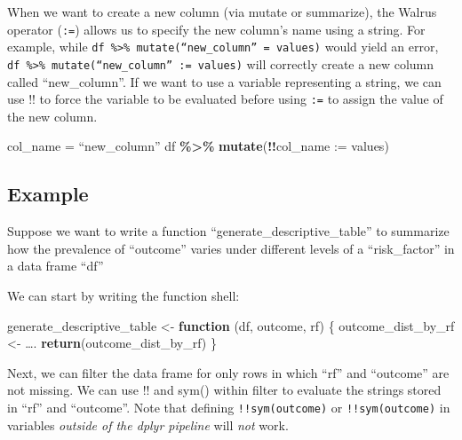 \documentclass[
]{book}
\newenvironment{Shaded}{\begin{snugshade}}{\end{snugshade}}
\newcommand{\AttributeTok}[1]{\textcolor[rgb]{0.13,0.29,0.53}{#1}}
\newcommand{\ControlFlowTok}[1]{\textcolor[rgb]{0.13,0.29,0.53}{\textbf{#1}}}
\newcommand{\FunctionTok}[1]{\textcolor[rgb]{0.13,0.29,0.53}{\textbf{#1}}}
\newcommand{\NormalTok}[1]{#1}
\newcommand{\OtherTok}[1]{\textcolor[rgb]{0.56,0.35,0.01}{#1}}
\newcommand{\SpecialCharTok}[1]{\textcolor[rgb]{0.81,0.36,0.00}{\textbf{#1}}}
\begin{document}
When we want to create a new column (via mutate or summarize), the Walrus operator (\texttt{:=}) allows us to specify the new column's name using a string. For example, while \texttt{df\ \%\textgreater{}\%\ mutate(“new\_column”\ =\ values)} would yield an error, \texttt{df\ \%\textgreater{}\%\ mutate(“new\_column”\ :=\ values)} will correctly create a new column called ``new\_column''.
If we want to use a variable representing a string, we can use !! to force the variable to be evaluated before using \texttt{:=} to assign the value of the new column.

\begin{Shaded}
\begin{Highlighting}[]
\NormalTok{col\_name }\OtherTok{=}\NormalTok{ “new\_column”}
\NormalTok{df }\SpecialCharTok{\%\textgreater{}\%} \FunctionTok{mutate}\NormalTok{(}\SpecialCharTok{!!}\AttributeTok{col\_name :=}\NormalTok{ values)}
\end{Highlighting}
\end{Shaded}

\subsection{Example}\label{example}

Suppose we want to write a function ``generate\_descriptive\_table'' to summarize how the prevalence of ``outcome'' varies under different levels of a ``risk\_factor'' in a data frame ``df''

We can start by writing the function shell:

\begin{Shaded}
\begin{Highlighting}[]
\NormalTok{generate\_descriptive\_table }\OtherTok{\textless{}{-}} \ControlFlowTok{function}\NormalTok{ (df, outcome, rf) \{}
\NormalTok{outcome\_dist\_by\_rf }\OtherTok{\textless{}{-}}\NormalTok{ ….}
\FunctionTok{return}\NormalTok{(outcome\_dist\_by\_rf)}
\NormalTok{\}}
\end{Highlighting}
\end{Shaded}

Next, we can filter the data frame for only rows in which ``rf'' and ``outcome'' are not missing. We can use !! and sym() within filter to evaluate the strings stored in ``rf'' and ``outcome''. Note that defining \texttt{!!sym(outcome)} or \texttt{!!sym(outcome)} in variables \emph{outside of the dplyr pipeline} will \emph{not} work.
\end{document}
